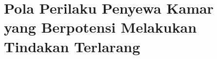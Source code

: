 










\section{Pola Perilaku Penyewa Kamar yang Berpotensi Melakukan Tindakan Terlarang}\label{sec:pola_perilaku}

